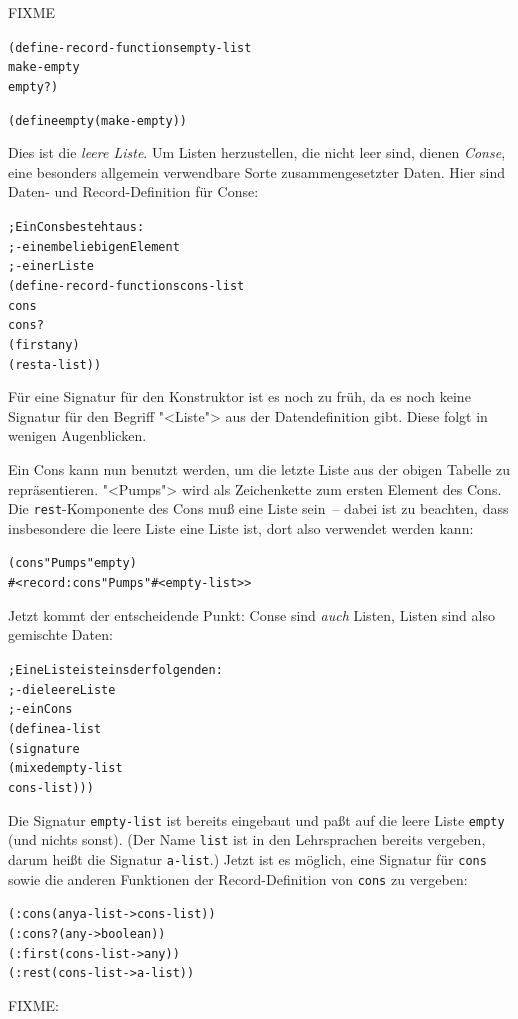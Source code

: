 FIXME
%
\begin{alltt}
(define-record-functions empty-list
  make-empty
  empty?)

(define empty (make-empty))
\end{alltt}
%
Dies ist die \textit{leere Liste}.  Um Listen herzustellen, die nicht leer
sind, dienen \textit{Conse}, eine besonders allgemein
verwendbare Sorte zusammengesetzter Daten.  Hier sind Daten- und
Record-Definition für Conse:\label{def:cons}
%
\begin{alltt}
; Ein Cons besteht aus:
; - einem beliebigen Element
; - einer Liste
(define-record-functions cons-list
  cons
  cons?
  (first any)
  (rest  a-list))
\end{alltt}
%
Für eine Signatur für den Konstruktor ist es noch zu früh, da es noch
keine Signatur für den Begriff "<Liste"> aus der Datendefinition
gibt.  Diese folgt in wenigen Augenblicken.

Ein Cons kann nun benutzt werden, um die letzte Liste aus der obigen
Tabelle zu repräsentieren.  "<Pumps"> wird als Zeichenkette zum ersten
Element des Cons.  Die \texttt{rest}-Komponente des Cons muß eine
Liste sein~-- dabei ist zu beachten, dass insbesondere die leere Liste
eine Liste ist, dort also verwendet werden kann:
%
\begin{alltt}
(cons "Pumps" empty)
\evalsto{} #<record:cons "Pumps" #<empty-list>>
\end{alltt}
%
Jetzt kommt der entscheidende Punkt: Conse sind \emph{auch} Listen,
Listen sind also gemischte Daten:\label{def:a-list}
%
\begin{alltt}
; Eine Liste ist eins der folgenden:
; - die leere Liste
; - ein Cons
(define a-list
  (signature
   (mixed empty-list
          cons-list)))
\end{alltt}
%
Die Signatur \texttt{empty-list} ist bereits eingebaut und paßt auf
die leere Liste \texttt{empty} (und nichts sonst).  (Der Name
\texttt{list} ist in den Lehrsprachen bereits vergeben, darum
heißt die Signatur \texttt{a-list}.)  Jetzt ist es möglich, eine
Signatur für \texttt{cons} sowie die anderen Funktionen der
Record-Definition von \texttt{cons} zu vergeben:
%
\begin{alltt}
(: cons (any a-list -> cons-list))
(: cons? (any -> boolean))
(: first (cons-list -> any))
(: rest (cons-list -> a-list))
\end{alltt}
%
FIXME:

